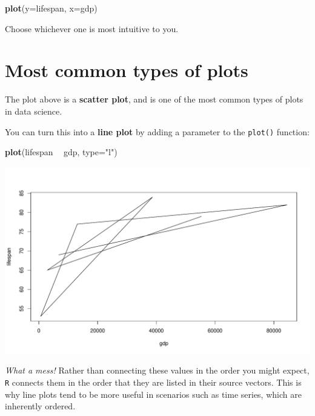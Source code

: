 \documentclass[
]{book}
\newenvironment{Shaded}{\begin{snugshade}}{\end{snugshade}}
\newcommand{\DataTypeTok}[1]{\textcolor[rgb]{0.13,0.29,0.53}{#1}}
\newcommand{\KeywordTok}[1]{\textcolor[rgb]{0.13,0.29,0.53}{\textbf{#1}}}
\newcommand{\NormalTok}[1]{#1}
\newcommand{\OperatorTok}[1]{\textcolor[rgb]{0.81,0.36,0.00}{\textbf{#1}}}
\newcommand{\StringTok}[1]{\textcolor[rgb]{0.31,0.60,0.02}{#1}}
\begin{document}
\begin{Shaded}
\begin{Highlighting}[]
\KeywordTok{plot}\NormalTok{(}\DataTypeTok{y=}\NormalTok{lifespan, }\DataTypeTok{x=}\NormalTok{gdp)}
\end{Highlighting}
\end{Shaded}

Choose whichever one is most intuitive to you.

\hypertarget{most-common-types-of-plots}{%
\section*{Most common types of plots}\label{most-common-types-of-plots}}

The plot above is a \textbf{scatter plot}, and is one of the most common types of plots in data science.

You can turn this into a \textbf{line plot} by adding a parameter to the \texttt{plot()} function:

\begin{Shaded}
\begin{Highlighting}[]
\KeywordTok{plot}\NormalTok{(lifespan }\OperatorTok{~}\StringTok{ }\NormalTok{gdp, }\DataTypeTok{type=}\StringTok{"l"}\NormalTok{)}
\end{Highlighting}
\end{Shaded}

\includegraphics{figures/unnamed-chunk-100-1.pdf}

\emph{What a mess!} Rather than connecting these values in the order you might expect, \texttt{R} connects them in the order that they are listed in their source vectors. This is why line plots tend to be more useful in scenarios such as time series, which are inherently ordered.
\end{document}
